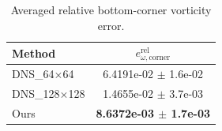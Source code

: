 \begin{table}[t]
\centering
\caption{Averaged relative bottom-corner vorticity error.}
\label{tab:corner_vorticity_relative_l2}
\begin{tabular}{lc}
\toprule
Method & $e^{\mathrm{rel}}_{\omega,\mathrm{corner}}$ \\
\midrule
DNS\_64$\times$64 & 6.4191e-02 $\pm$ 1.6e-02 \\
DNS\_128$\times$128 & 1.4655e-02 $\pm$ 3.7e-03 \\
Ours & \textbf{8.6372e-03 $\pm$ 1.7e-03} \\
\bottomrule
\end{tabular}
\end{table}
